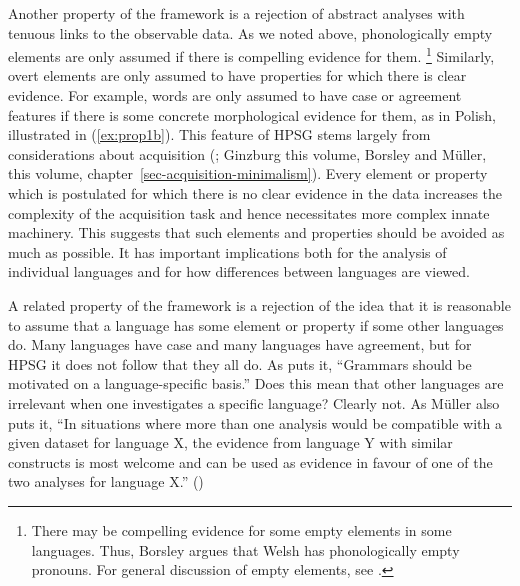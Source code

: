\documentclass[output=paper
	        ,collection
	        ,collectionchapter
 	        ,biblatex
                ,babelshorthands
                ,newtxmath
                ,draftmode
                ,colorlinks, citecolor=brown
]{langscibook}
\begin{document}




Another property of the framework is a rejection of abstract analyses with tenuous links to the observable data. As we noted above, phonologically empty elements are only assumed if there is compelling evidence for them.%
%
\footnote{There may be compelling evidence for some empty elements in some languages. Thus, \citet[section~8]{Borsley2009a-u}Borsley argues that Welsh has phonologically empty pronouns. For general discussion of empty elements, see \citet[chapter~19.2]{MuellerGT-Eng1-linked}.}
%
Similarly, overt elements are only assumed to have properties for which there is clear evidence. For example, words are only assumed to have case or agreement features if there is some concrete morphological evidence for them, as in Polish, illustrated in (\ref{ex:prop1b}). This feature of HPSG stems largely from considerations about acquisition (\citealt[chapter~19]{MuellerGT-Eng1-linked}; Ginzburg this volume, Borsley and Müller, this volume, chapter~\ref{sec-acquisition-minimalism}). Every element or property which is postulated for which there is no clear evidence in the data increases the complexity of the acquisition task and hence necessitates more complex innate machinery. This suggests that such elements and properties should be avoided as much as possible. It has important implications both for the analysis of individual languages and for how differences between languages are viewed.
	
A related property of the framework is a rejection of the idea that it is reasonable to assume that a language has some element or property if some other languages do. Many languages have case and many languages have agreement, but for HPSG it does not follow that they all do. As \citet[25]{MuellerCoreGram} puts it, “Grammars should be motivated on a language-specific basis.” Does this mean that other languages are irrelevant when one investigates a specific language? Clearly not. As Müller also puts it, “In situations where more than one analysis would be compatible with a given dataset for language X, the evidence from language Y with similar constructs is most welcome and can be used as evidence in favour of one of the two analyses for language X.” (\citeyear[43]{MuellerCoreGram})
\end{document}
